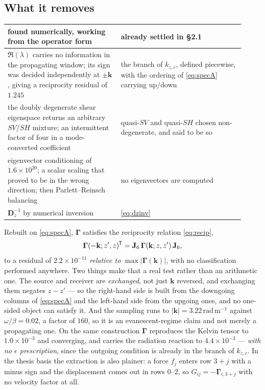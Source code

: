 \documentclass[11pt,a4paper]{article}
\newcommand{\Jsix}{\mathbf{J}_{6}}
\newcommand{\tp}{^{\mkern-1.5mu\mathsf{T}}}
\begin{document}
\subsection{What it removes}

\begin{center}
\begin{tabular}{p{0.44\linewidth}p{0.48\linewidth}}
\toprule
found numerically, working from the operator form & already settled in \S2.1\\
\midrule
$\Re(\lambda)$ carries no information in the propagating window; its sign was
decided independently at $\pm\mathbf{k}$, giving a reciprocity residual of
$1.245$ &
the branch of $k_{z,c}$, defined piecewise, with the ordering of
\eqref{eq:specA} carrying up/down\\[4pt]
the doubly degenerate shear eigenspace returns an arbitrary $SV$/$SH$ mixture;
an intermittent factor of four in a mode-converted coefficient &
quasi-$SV$ and quasi-$SH$ chosen non-degenerate, and said to be so\\[4pt]
eigenvector conditioning of $1.6\times10^{20}$; a scalar scaling that proved to
be in the wrong direction; then Parlett--Reinsch balancing &
no eigenvectors are computed\\[4pt]
$\mathbf{D}_z^{-1}$ by numerical inversion & \eqref{eq:dzinv}\\
\bottomrule
\end{tabular}
\end{center}

Rebuilt on \eqref{eq:specA}, $\boldsymbol\Gamma$ satisfies the reciprocity
relation \eqref{eq:recip},
\begin{equation}\label{eq:recipagain}
  \boldsymbol\Gamma(-\mathbf{k}; z', z)\tp =
  \Jsix\,\boldsymbol\Gamma(\mathbf{k}; z, z')\,\Jsix ,
\end{equation}
to a residual of $2.2\times10^{-11}$ \emph{relative to}
$\max|\boldsymbol\Gamma(\mathbf{k})|$, with no classification performed
anywhere.  Two things make that a real test rather than an arithmetic one.  The
source and receiver are \emph{exchanged}, not just $\mathbf{k}$ reversed, and
exchanging them negates $z-z'$ --- so the right-hand side is built from the
downgoing columns of \eqref{eq:specA} and the left-hand side from the upgoing
ones, and no one-sided object can satisfy it.  And the sampling runs to
$|\mathbf{k}| = 3.22\,\mathrm{rad\,m^{-1}}$ against
$\omega/\beta = 0.02$, a factor of $160$, so it is an evanescent-regime claim
and not merely a propagating one.  On the same construction
$\boldsymbol\Gamma$ reproduces the Kelvin tensor to $1.0\times10^{-3}$ and
converging, and carries the radiation reaction to $4.4\times10^{-3}$ ---
\emph{with no $\epsilon$ prescription}, since the outgoing condition is already
in the branch of $k_{z,c}$.  In the thesis
basis the extraction is also plainer: a force $f_j$ enters row $3+j$ with a
minus sign and the displacement comes out in rows $0$--$2$, so
$G_{ij} = -\boldsymbol\Gamma_{i,3+j}$ with no velocity factor at all.
\end{document}
